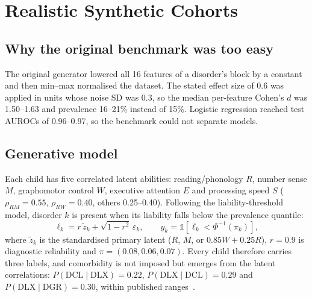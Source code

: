 \documentclass[conference]{IEEEtran}
\begin{document}
\section{Realistic Synthetic Cohorts}\label{sec:cohort}
\subsection{Why the original benchmark was too easy}
The original generator lowered all 16 features of a disorder's block by a constant and then min--max normalised the dataset. The stated effect size of 0.6 was applied in units whose noise SD was 0.3, so the median per-feature Cohen's $d$ was 1.50--1.63 and prevalence 16--21\% instead of 15\%. Logistic regression reached test AUROCs of 0.96--0.97, so the benchmark could not separate models.

\subsection{Generative model}
Each child has five correlated latent abilities: reading/phonology $R$, number sense $M$, graphomotor control $W$, executive attention $E$ and processing speed $S$ ($\rho_{RM}{=}0.55$, $\rho_{RW}{=}0.40$, others 0.25--0.40). Following the liability-threshold model, disorder $k$ is present when its liability falls below the prevalence quantile:
\begin{equation}
\ell_k = r\,\tilde z_k + \sqrt{1-r^2}\,\varepsilon_k,\qquad y_k=\mathbb{1}\!\left[\ell_k<\Phi^{-1}(\pi_k)\right],
\end{equation}
where $\tilde z_k$ is the standardised primary latent ($R$, $M$, or $0.85W{+}0.25R$), $r{=}0.9$ is diagnostic reliability and $\pi{=}(0.08,0.06,0.07)$. Every child therefore carries three labels, and comorbidity is not imposed but emerges from the latent correlations: $P(\text{DCL}\mid\text{DLX}){=}0.22$, $P(\text{DLX}\mid\text{DCL}){=}0.29$ and $P(\text{DLX}\mid\text{DGR}){=}0.30$, within published ranges~\cite{willcutt2013}.
\end{document}
